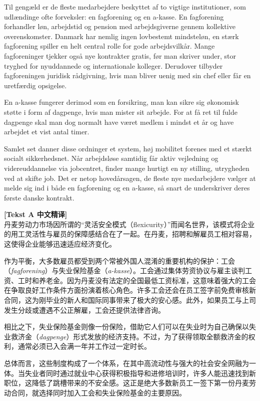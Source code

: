 Til gengæld er de fleste medarbejdere beskyttet af to vigtige institutioner, som udlændinge ofte forveksler: en fagforening og en a-kasse. En fagforening forhandler løn, arbejdstid og pension med arbejdsgiverne gennem kollektive overenskomster. Danmark har nemlig ingen lovbestemt mindsteløn,  en stærk fagforening spiller en helt central rolle for gode arbejdsvilkår. Mange fagforeninger tjekker også nye kontrakter gratis, før man skriver under,  stor tryghed for nyuddannede og internationale kolleger. Derudover tilbyder fagforeningen juridisk rådgivning, hvis man bliver uenig med sin chef eller får en uretfærdig opsigelse.

En a-kasse fungerer derimod som en forsikring,  man kan sikre sig økonomisk støtte i form af dagpenge, hvis man mister sit arbejde. For at få ret til fulde dagpenge skal man dog normalt have været medlem i mindst et år og have arbejdet et vist antal timer.

Samlet set danner disse ordninger et system,  høj mobilitet forenes med et stærkt socialt sikkerhedsnet. Når arbejdsløse samtidig får aktiv vejledning og videreuddannelse via jobcentret, finder mange hurtigt en ny stilling,  utrygheden ved at skifte job. Det er netop hovedårsagen,  de fleste nye medarbejdere vælger at melde sig ind i både en fagforening og en a-kasse, så snart de underskriver deres første danske kontrakt.

\begin{transbox}
\small
\textbf{\color{NCDTeal}[Tekst A 中文精译]}\\
丹麦劳动力市场因所谓的“灵活安全模式（flexicurity）”而闻名世界，该模式将企业的用工灵活性与雇员的保障感结合在了一起。在丹麦，招聘和解雇员工相对容易，这使得企业能够迅速适应经济变化。

作为平衡，大多数雇员都受到两个常被外国人混淆的重要机构的保护：工会（\textit{fagforening}）与失业保险基金（\textit{a-kasse}）。工会通过集体劳资协议与雇主谈判工资、工时和养老金。因为丹麦没有法定的全国最低工资标准，这意味着强大的工会在争取良好工作条件方面扮演着核心角色。许多工会还会在员工签字前免费审核新合同，这为刚毕业的新人和国际同事带来了极大的安心感。此外，如果员工与上司发生分歧或遭遇不公正解雇，工会还提供法律咨询。

相比之下，失业保险基金则像一份保险，借助它人们可以在失业时为自己确保以失业救济金（\textit{dagpenge}）形式发放的经济支持。不过，为了获得领取全额救济金的权利，通常必须已入会满一年并工作过一定时长。

总体而言，这些制度构成了一个体系，在其中高流动性与强大的社会安全网融为一体。当失业者同时通过就业中心获得积极指导和进修培训时，许多人能迅速找到新职位，这降低了跳槽带来的不安全感。这正是绝大多数新员工一签下第一份丹麦劳动合同，就选择同时加入工会和失业保险基金的主要原因。
\end{transbox}

